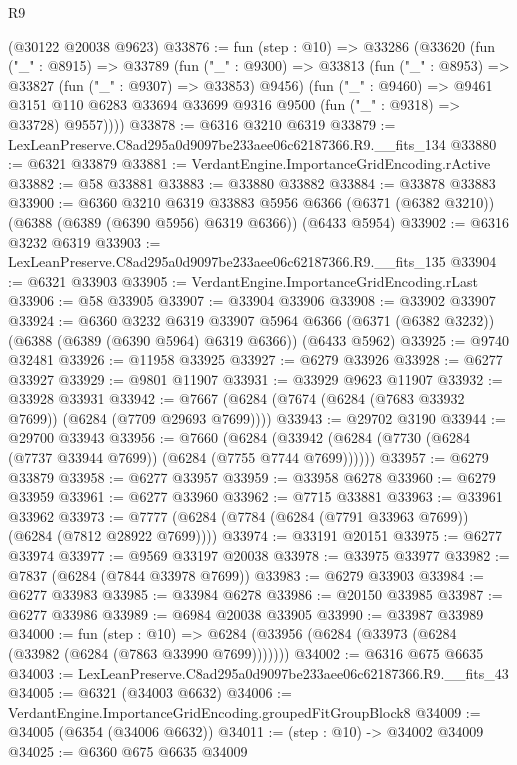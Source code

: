 \begin{lexlean}{R9}
\begin{coremodule}
    (@30122 @20038 @9623)
@33876 := fun (step : @10) =>
  @33286
    (@33620
      (fun ("_" : @8915) =>
      @33789
        (fun ("_" : @9300) =>
        @33813
          (fun ("_" : @8953) => @33827 (fun ("_" : @9307) => @33853) @9456)
          (fun ("_" : @9460) =>
          @9461 @3151 @110 @6283 @33694 @33699 @9316 @9500 (fun ("_" : @9318) => @33728) @9557))))
@33878 := @6316 @3210 @6319
@33879 := LexLeanPreserve.C8ad295a0d9097be233aee06c62187366.R9.__fits_134
@33880 := @6321 @33879
@33881 := VerdantEngine.ImportanceGridEncoding.rActive
@33882 := @58 @33881
@33883 := @33880 @33882
@33884 := @33878 @33883
@33900 := @6360
    @3210
    @6319
    @33883
    @5956
    @6366
    (@6371 (@6382 @3210))
    (@6388 (@6389 (@6390 @5956) @6319 @6366))
    (@6433 @5954)
@33902 := @6316 @3232 @6319
@33903 := LexLeanPreserve.C8ad295a0d9097be233aee06c62187366.R9.__fits_135
@33904 := @6321 @33903
@33905 := VerdantEngine.ImportanceGridEncoding.rLast
@33906 := @58 @33905
@33907 := @33904 @33906
@33908 := @33902 @33907
@33924 := @6360
    @3232
    @6319
    @33907
    @5964
    @6366
    (@6371 (@6382 @3232))
    (@6388 (@6389 (@6390 @5964) @6319 @6366))
    (@6433 @5962)
@33925 := @9740 @32481
@33926 := @11958 @33925
@33927 := @6279 @33926
@33928 := @6277 @33927
@33929 := @9801 @11907
@33931 := @33929 @9623 @11907
@33932 := @33928 @33931
@33942 := @7667 (@6284 (@7674 (@6284 (@7683 @33932 @7699)) (@6284 (@7709 @29693 @7699))))
@33943 := @29702 @3190
@33944 := @29700 @33943
@33956 := @7660
    (@6284 (@33942 (@6284 (@7730 (@6284 (@7737 @33944 @7699)) (@6284 (@7755 @7744 @7699))))))
@33957 := @6279 @33879
@33958 := @6277 @33957
@33959 := @33958 @6278
@33960 := @6279 @33959
@33961 := @6277 @33960
@33962 := @7715 @33881
@33963 := @33961 @33962
@33973 := @7777 (@6284 (@7784 (@6284 (@7791 @33963 @7699)) (@6284 (@7812 @28922 @7699))))
@33974 := @33191 @20151
@33975 := @6277 @33974
@33977 := @9569 @33197 @20038
@33978 := @33975 @33977
@33982 := @7837 (@6284 (@7844 @33978 @7699))
@33983 := @6279 @33903
@33984 := @6277 @33983
@33985 := @33984 @6278
@33986 := @20150 @33985
@33987 := @6277 @33986
@33989 := @6984 @20038 @33905
@33990 := @33987 @33989
@34000 := fun (step : @10) =>
  @6284 (@33956 (@6284 (@33973 (@6284 (@33982 (@6284 (@7863 @33990 @7699)))))))
@34002 := @6316 @675 @6635
@34003 := LexLeanPreserve.C8ad295a0d9097be233aee06c62187366.R9.__fits_43
@34005 := @6321 (@34003 @6632)
@34006 := VerdantEngine.ImportanceGridEncoding.groupedFitGroupBlock8
@34009 := @34005 (@6354 (@34006 @6632))
@34011 := (step : @10) -> @34002 @34009
@34025 := @6360
    @675
    @6635
    @34009

\end{coremodule}
\end{lexlean}
